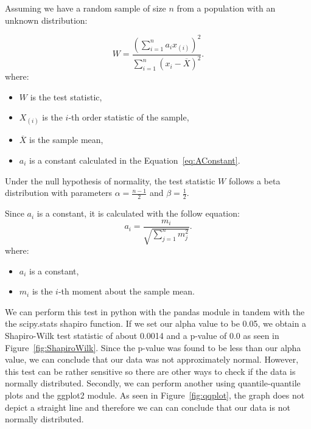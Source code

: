 \documentclass[12pt]{article}
\begin{document}
Assuming we have a random sample of size $n$ from a population with an unknown distribution:

\begin{equation}
W = \frac{(\sum_{i=1}^{n}a_i x_{(i)})^2}{\sum_{i=1}^{n}(x_{i}-\overline{X})^2}.
\label{eq:Shapiro} 
\end{equation}
where:
\begin{itemize}
\item $W$ is the test statistic,
\item $X_{(i)}$ is the $i$-th order statistic of the sample,
\item $\overline{X}$ is the sample mean,
\item $a_i$ is a constant calculated in the Equation~\ref{eq:AConstant}.
\end{itemize}

Under the null hypothesis of normality, the test statistic $W$ follows a beta distribution with parameters $\alpha = \frac{n-1}{2}$ and $\beta = \frac{1}{2}$.

Since $a_i$ is a constant, it is calculated with the follow equation:
\begin{equation}
a_i = \frac{m_i}{\sqrt{\sum_{j=1}^n m_j^2}}.
\label{tab:eqAConstant} 
\end{equation}
where:
\begin{itemize}
\item $a_i$ is a constant,
\item $m_i$ is the $i$-th moment about the sample mean.
\end{itemize}


We can perform this test in python with the pandas module in tandem with the the scipy.stats shapiro function. If we set our alpha value to be 0.05, we obtain a Shapiro-Wilk test statistic of about 0.0014 and a p-value of 0.0 as seen in Figure~\ref{fig:ShapiroWilk}. Since the p-value was found to be less than our alpha value, we can conclude that our data was not approximately normal. However, this test can be rather sensitive so there are other ways to check if the data is normally distributed. Secondly, we can perform another using quantile-quantile plots and the ggplot2 module. As seen in Figure~\ref{fig:qqplot}, the graph does not depict a straight line and therefore we can can conclude that our data is not normally distributed.
\end{document}
